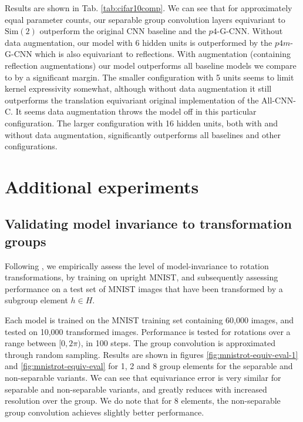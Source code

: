 \documentclass[nohyperref]{article}
\theoremstyle{plain}
\theoremstyle{definition}
\theoremstyle{remark}
\begin{document}
Results are shown in Tab. \ref{tab:cifar10comp}. We can see that for approximately equal parameter counts, our separable group convolution layers equivariant to $\mathrm{Sim(2)}$ outperform the original CNN baseline and the $p4$-G-CNN. Without data augmentation, our model with 6 hidden units is outperformed by the $p4m$-G-CNN which is also equivariant to reflections. With augmentation (containing reflection augmentations) our model outperforms all baseline models we compare to by a significant margin. The smaller configuration with 5 units seems to limit kernel expressivity somewhat, although without data augmentation it still outperforms the translation equivariant original implementation of the All-CNN-C. It seems data augmentation throws the model off in this particular configuration. The larger configuration with 16 hidden units, both with and without data augmentation, significantly outperforms all baselines and other configurations.

\section{Additional experiments}
\subsection{Validating model invariance to transformation groups} \label{app:equivariancetest}
Following \citet{weiler2018learning}, we empirically assess the level of model-invariance to rotation transformations, by training on upright MNIST, and subsequently assessing performance on a test set of MNIST images that have been transformed by a subgroup element $h \in H$.

Each model is trained on the MNIST training set containing 60,000 images, and tested on 10,000 transformed images. Performance is tested for rotations over a range between $[0, 2\pi)$, in 100 steps. The group convolution is approximated through random sampling. Results are shown in figures \ref{fig:mnistrot-equiv-eval-1} and \ref{fig:mnistrot-equiv-eval} for 1, 2 and 8 group elements for the separable and non-separable variants. We can see that equivariance error is very similar for separable and non-separable variants, and greatly reduces with increased resolution over the group. We do note that for 8 elements, the non-separable group convolution achieves slightly better performance. 
\end{document}

